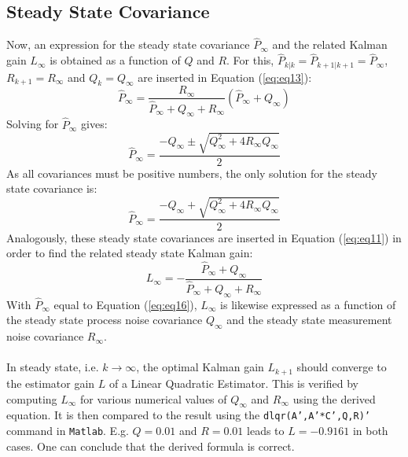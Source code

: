 \documentclass[a4paper,kul]{kulakarticle} %
\begin{document}
\subsection{Steady State Covariance}
Now, an expression for the steady state covariance $\hat{P}_\infty$ and the related Kalman gain $L_\infty$ is obtained as a function of $Q$ and $R$. For this, $\hat{P}_{k|k} = \hat{P}_{k+1|k+1} = \hat{P}_\infty$, $R_{k+1} = R_{\infty}$ and $Q_k = Q_\infty$ are inserted in Equation (\ref{eq:eq13}):
\begin{equation}
	\hat{P}_\infty = \frac{R_{\infty}}{\hat{P}_{\infty} + Q_\infty + R_{\infty}}\left(\hat{P}_{\infty} + Q_\infty\right)
\end{equation}
Solving for $\hat{P}_\infty$ gives:
\begin{equation}
	\hat{P}_\infty = \frac{-Q_\infty \pm \sqrt{Q_\infty^2 + 4R_\infty Q_\infty}}{2}
\end{equation}
As all covariances must be positive numbers, the only solution for the steady state covariance is: 
\begin{equation}
\hat{P}_\infty = \frac{-Q_\infty + \sqrt{Q_\infty^2 + 4R_\infty Q_\infty}}{2}
\label{eq:eq16}
\end{equation}
Analogously, these steady state covariances are inserted in Equation (\ref{eq:eq11}) in order to find the related steady state Kalman gain:
\begin{equation}
L_\infty = - \frac{\hat{P}_\infty + Q_\infty}{\hat{P}_\infty + Q_\infty + R_\infty}
\label{eq:eq17}
\end{equation}
With $\hat{P}_\infty$ equal to Equation (\ref{eq:eq16}), $L_\infty$ is likewise expressed as a function of the steady state process noise covariance $Q_\infty$ and the steady state measurement noise covariance $R_\infty$.
\\\\
In steady state, i.e. $k \rightarrow \infty$, the optimal Kalman gain $L_{k+1}$ should converge to the estimator gain $L$ of a Linear Quadratic Estimator. This is verified by computing $L_\infty$ for various numerical values of $Q_\infty$ and $R_\infty$ using the derived equation. It is then compared to the result using the \texttt{dlqr(A',A'*C',Q,R)'} command in \texttt{Matlab}. E.g. $Q = 0.01$ and $R = 0.01$ leads to $L = -0.9161$ in both cases. One can conclude that the derived formula is correct.
\end{document}
